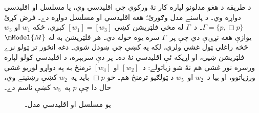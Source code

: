 \documentclass[../../../include/open-logic-section]{subfiles}
\begin{document}


د  طريقه د هغو مدلونو لپاره کار نۀ ورکوي چې اقليدسي
وي، يا مسلسل او اقليدسي دواړه وي۔ د  پاسنے مدل
وګورئ؛ هغه اقليدسي او مسلسل دواړه دے۔ فرض کړئ
$\Gamma = \{p, \Box p \}$۔ د~$\Gamma$ له مخې فلټريشن کښې
$[w_1] = [w_3]$ کېږي، ځکه $w_1$ او $w_3$ يوازې هغه نړۍې دي
چې پر~$\Gamma$ سره يوه خوله دي۔ هر فلټريشن به له
$\mModel{M}$ څخه راغلي ټول غشي ولري، لکه په
 کښې چې ښودل شوي۔ دغه انځور تر ټولو نرے
فلټريشن ښيي، او اړيکه ئې اقليدسي نۀ ده۔
پر دې سربېره، د اقليدسي کولو لپاره ورسره نور غشي هم نۀ شو
زياتولے: د~$[w_2]$ او $[w_4]$ ترمنځ به په دواړو لوريو غشي
ورزياتوو، او بيا د~$w_2$ او~$w_5$ د ټولګيو ترمنځ هم۔ خو
$\Box p$ بايد په~$w_2$ کښې رښتينے وي، حال دا چې $p$ په~$w_5$
کښې ناسم دے۔

\begin{figure}[htpb]
  \centering
  \caption{يو مسلسل او اقليدسي مدل۔}
\end{figure}
\end{document}
